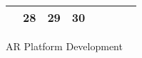 {\begin{tabularx}{\linewidth}{|l!{\vrule width \myLenLineThicknessThick}*{7}{@{}X@{}|}}
       & 
    
      
      
        \begin{minipage}[t]{6mm}\centering{}28\end{minipage}
      
       & 
    
      
      
        \begin{minipage}[t]{6mm}\centering{}29\end{minipage}
      
       & 
    
      
      
        \begin{minipage}[t]{6mm}\centering{}30\end{minipage}
      
       & 
    
      
      
       & 
    
      
      
       & 
    
      
      
      
        \\  \hline 
      
    
  
  
  \end{tabularx}
}
\vfill{\centering{} \small{AR Platform Development}\hspace{ 1.5em }\par}


